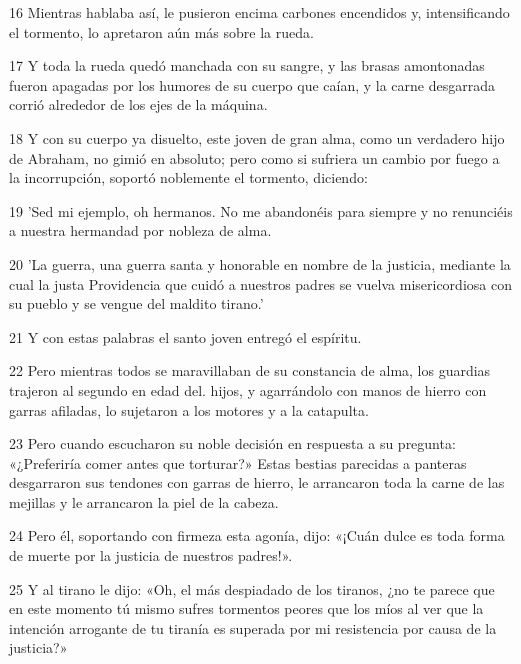 \par 16 Mientras hablaba así, le pusieron encima carbones encendidos y, intensificando el tormento, lo apretaron aún más sobre la rueda.

\par 17 Y toda la rueda quedó manchada con su sangre, y las brasas amontonadas fueron apagadas por los humores de su cuerpo que caían, y la carne desgarrada corrió alrededor de los ejes de la máquina.

\par 18 Y con su cuerpo ya disuelto, este joven de gran alma, como un verdadero hijo de Abraham, no gimió en absoluto; pero como si sufriera un cambio por fuego a la incorrupción, soportó noblemente el tormento, diciendo:

\par 19 'Sed mi ejemplo, oh hermanos. No me abandonéis para siempre y no renunciéis a nuestra hermandad por nobleza de alma.

\par 20 'La guerra, una guerra santa y honorable en nombre de la justicia, mediante la cual la justa Providencia que cuidó a nuestros padres se vuelva misericordiosa con su pueblo y se vengue del maldito tirano.'

\par 21 Y con estas palabras el santo joven entregó el espíritu.

\par 22 Pero mientras todos se maravillaban de su constancia de alma, los guardias trajeron al segundo en edad del. hijos, y agarrándolo con manos de hierro con garras afiladas, lo sujetaron a los motores y a la catapulta.

\par 23 Pero cuando escucharon su noble decisión en respuesta a su pregunta: «¿Preferiría comer antes que torturar?» Estas bestias parecidas a panteras desgarraron sus tendones con garras de hierro, le arrancaron toda la carne de las mejillas y le arrancaron la piel de la cabeza.

\par 24 Pero él, soportando con firmeza esta agonía, dijo: «¡Cuán dulce es toda forma de muerte por la justicia de nuestros padres!».

\par 25 Y al tirano le dijo: «Oh, el más despiadado de los tiranos, ¿no te parece que en este momento tú mismo sufres tormentos peores que los míos al ver que la intención arrogante de tu tiranía es superada por mi resistencia por causa de la justicia?»

